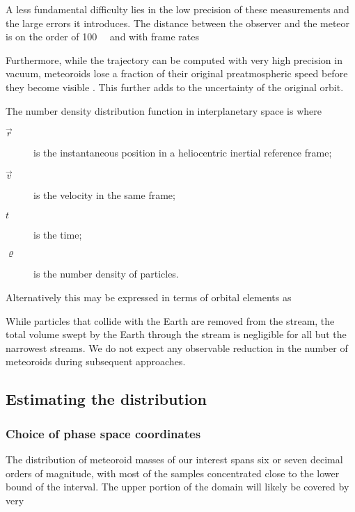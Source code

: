     A less fundamental difficulty lies in the low precision of these measurements and the large errors it introduces.
    The distance between the observer and the meteor is on the order of \SI{100}{\kilo\metres}
    and with frame rates

    Furthermore, while the trajectory can be computed with very high precision in vacuum,
    meteoroids lose a fraction of their original preatmospheric speed before they become visible \citep{vida+2018}.
    This further adds to the uncertainty of the original orbit.

    The number density distribution function in interplanetary space is
    where
    \begin{description}
        \item[$\vec{r}$]    is the instantaneous position in a heliocentric inertial reference frame;
        \item[$\vec{v}$]    is the velocity in the same frame;
        \item[$t$]          is the time;
        \item[$\varrho$]    is the number density of particles.
    \end{description}

    Alternatively this may be expressed in terms of orbital elements as

    While particles that collide with the Earth are removed from the stream,
    the total volume swept by the Earth through the stream is negligible for all but the narrowest streams.
    We do not expect any observable reduction in the number of meteoroids during subsequent approaches.

    \subsection{Estimating the distribution} \label{mod}

    
        \subsubsection{Choice of phase space coordinates} \label{modc}
            The distribution of meteoroid masses of our interest spans six or seven decimal orders of magnitude,
            with most of the samples concentrated close to the lower bound of the interval.
            The upper portion of the domain will likely be covered by very 
            

